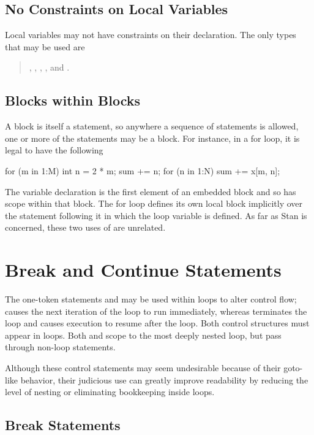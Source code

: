 \subsection{No Constraints on Local Variables}

Local variables may not have constraints on their declaration.  The
only types that may be used are
%
\begin{quote}
, ,
, , and .
\end{quote}

\subsection{Blocks within Blocks}

A block is itself a statement, so anywhere a sequence of statements is
allowed, one or more of the statements may be a block.  For instance,
in a for loop, it is legal to have the following
%
\begin{stancode}
for (m in 1:M) {
  {
     int n = 2 * m;
     sum += n;
  }
  for (n in 1:N)
    sum += x[m, n];
}
\end{stancode}
%
The variable declaration  is the first element of an
embedded block and so has scope within that block.  The for loop
defines its own local block implicitly over the statement following it
in which the loop variable is defined.  As far as Stan is concerned,
these two uses of  are unrelated.

\section{Break and Continue Statements}

The one-token statements  and  may be used
within loops to alter control flow;   causes the next
iteration of the loop to run immediately, whereas 
terminates the loop and causes execution to resume after the loop.
Both control structures must appear in loops.  Both  and
 scope to the most deeply nested loop, but pass through
non-loop statements.

Although these control statements may seem undesirable because of
their goto-like behavior, their judicious use can greatly improve
readability by reducing the level of nesting or eliminating bookkeeping
inside loops.

\subsection{Break Statements}

